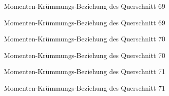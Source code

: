 \documentclass[
  11pt,
  letterpaper,
]{scrreprt}
\begin{document}
\begin{figure}[H]


\caption{\label{fig-qs_69}Momenten-Krümmungs-Beziehung des Querschnitt
69}

\end{figure}%

\begin{figure}[H]


\caption{\label{fig-m_chi_69}Momenten-Krümmungs-Beziehung des
Querschnitt 69}

\end{figure}%

\begin{figure}[H]


\caption{\label{fig-qs_70}Momenten-Krümmungs-Beziehung des Querschnitt
70}

\end{figure}%

\begin{figure}[H]


\caption{\label{fig-m_chi_70}Momenten-Krümmungs-Beziehung des
Querschnitt 70}

\end{figure}%

\begin{figure}[H]


\caption{\label{fig-qs_71}Momenten-Krümmungs-Beziehung des Querschnitt
71}

\end{figure}%

\begin{figure}[H]


\caption{\label{fig-m_chi_71}Momenten-Krümmungs-Beziehung des
Querschnitt 71}

\end{figure}%
\end{document}
